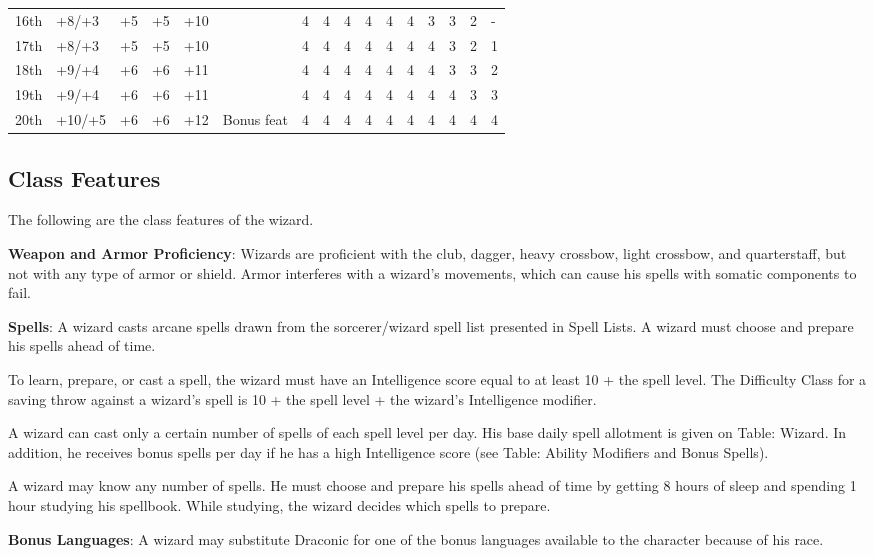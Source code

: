 \begin{table}[]
\begin{tabularx}{\linewidth}{lp{6em}p{2.5em}p{2.5em}p{2.5em}Xllllllllll}
16th & +8/+3 & +5 & +5 & +10 &  & 4 & 4 & 4 & 4 & 4 & 4 & 3 & 3 & 2 & -\\
17th & +8/+3 & +5 & +5 & +10 &  & 4 & 4 & 4 & 4 & 4 & 4 & 4 & 3 & 2 & 1\\
18th & +9/+4 & +6 & +6 & +11 &  & 4 & 4 & 4 & 4 & 4 & 4 & 4 & 3 & 3 & 2\\
19th & +9/+4 & +6 & +6 & +11 &  & 4 & 4 & 4 & 4 & 4 & 4 & 4 & 4 & 3 & 3\\
20th & +10/+5 & +6 & +6 & +12 & Bonus feat & 4 & 4 & 4 & 4 & 4 & 4 & 4 & 4 & 4 & 4\\
\end{tabularx}
\end{table}
				
\subsection{Class Features}

				
The following are the class features of the wizard.
				
\textbf{Weapon and Armor Proficiency}: Wizards are proficient with the club, dagger, heavy crossbow, light crossbow, and quarterstaff, but not with any type of armor or shield. Armor interferes with a wizard's movements, which can cause his spells with somatic components to fail.
				
\textbf{Spells}: A wizard casts arcane spells drawn from the sorcerer/wizard spell list presented in Spell Lists. A wizard must choose and prepare his spells ahead of time.
				
To learn, prepare, or cast a spell, the wizard must have an Intelligence score equal to at least 10 + the spell level. The Difficulty Class for a saving throw against a wizard's spell is 10 + the spell level + the wizard's Intelligence modifier.
				
A wizard can cast only a certain number of spells of each spell level per day. His base daily spell allotment is given on Table: Wizard. In addition, he receives bonus spells per day if he has a high Intelligence score (see Table: Ability Modifiers and Bonus Spells).
				
A wizard may know any number of spells. He must choose and prepare his spells ahead of time by getting 8 hours of sleep and spending 1 hour studying his spellbook. While studying, the wizard decides which spells to prepare.
				
\textbf{Bonus Languages}: A wizard may substitute Draconic for one of the bonus languages available to the character because of his race.
				
